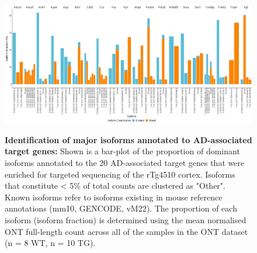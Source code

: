 \begin{landscape}
	\begin{figure}[htp]
		\centering
		\includegraphics[page=1,trim={0 1cm 0 0},scale =0.4]{Figures/GlobalIF.pdf}
		\captionsetup{width=1.5\textwidth}
		\label{fig:globalIF}
		\caption[Identification of major isoforms annotated to AD-associated target genes]%
		{\textbf{Identification of major isoforms annotated to AD-associated target genes:} Shown is a bar-plot of the proportion of dominant isoforms annotated to the 20 AD-associated target genes that were enriched for targeted sequencing of the rTg4510 cortex. Isoforms that constitute < 5\% of total counts are clustered as "Other". Known isoforms refer to isoforms existing in mouse reference annotations (mm10, GENCODE, vM22). The proportion of each isoform (isoform fraction) is determined using the mean normalised ONT full-length count across all of the samples in the ONT dataset (n = 8 WT, n = 10 TG). }   
	\end{figure}
\end{landscape}

\newpage
